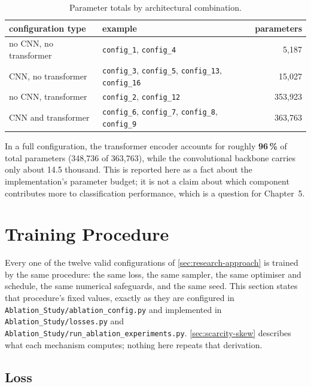 \begin{table}[htbp]
	\centering
	\begin{tabular}{l l r}
		\hline
		\textbf{configuration type} & \textbf{example} & \textbf{parameters} \\
		\hline
		no CNN, no transformer & \texttt{config\_1}, \texttt{config\_4} & 5,187 \\
		CNN, no transformer    & \texttt{config\_3}, \texttt{config\_5}, \texttt{config\_13}, \texttt{config\_16} & 15,027 \\
		no CNN, transformer    & \texttt{config\_2}, \texttt{config\_12} & 353,923 \\
		CNN and transformer    & \texttt{config\_6}, \texttt{config\_7}, \texttt{config\_8}, \texttt{config\_9} & 363,763 \\
		\hline
	\end{tabular}
	\caption[Parameter totals by architectural combination]{Parameter totals by architectural combination.}
	\label{tab:parameter-totals}
\end{table}

In a full configuration, the transformer encoder accounts for roughly \textbf{96\,\%} of total parameters (348,736 of 363,763), while the convolutional backbone carries only about 14.5 thousand. This is reported here as a fact about the implementation's parameter budget; it is not a claim about which component contributes more to classification performance, which is a question for Chapter~5.


\section{Training Procedure}
\label{sec:training-procedure}

Every one of the twelve valid configurations of \autoref{sec:research-approach} is trained by the same procedure: the same loss, the same sampler, the same optimiser and schedule, the same numerical safeguards, and the same seed. This section states that procedure's fixed values, exactly as they are configured in \texttt{Ablation\_Study/ablation\_config.py} and implemented in \texttt{Ablation\_Study/losses.py} and \texttt{Ablation\_Study/run\_ablation\_experiments.py}. \autoref{sec:scarcity-skew} describes what each mechanism computes; nothing here repeats that derivation.

\subsection{Loss}
\label{sec:loss-config}

